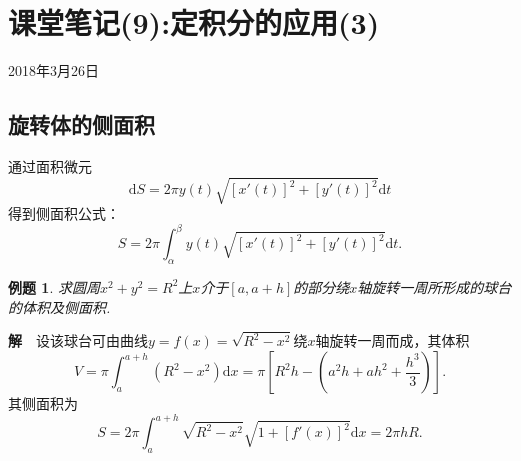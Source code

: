 \documentclass[UTF8]{article}
\newcommand{\dx}{\mathrm{d}x}
\newcommand{\jie}{\textbf{解}$\quad$}
\newtheorem{exa}{\hspace{2em}例题}[section]
\begin{document}
\section{课堂笔记(9):定积分的应用(3)}
\begin{center}
  2018年3月26日
\end{center}
\subsection{旋转体的侧面积}
通过面积微元
$$\mathrm{d}S=2\pi y(t)\sqrt{[x'(t)]^2+[y'(t)]^2}\mathrm{d}t$$得到侧面积公式：
$$S=2\pi\int_\alpha^\beta y(t)\sqrt{[x'(t)]^2+[y'(t)]^2}\mathrm{d}t.$$
\begin{exa}
  求圆周$x^2+y^2=R^2$上$x$介于$[a,a+h]$的部分绕$x$轴旋转一周所形成的球台的体积及侧面积.
\end{exa}
\jie 设该球台可由曲线$y=f(x)=\sqrt{R^2-x^2}$绕$x$轴旋转一周而成，其体积
$$V=\pi\int_a^{a+h}(R^2-x^2)\dx=\pi\left[R^2h-\left(a^2h+ah^2+\frac{h^3}{3}\right)\right].$$
其侧面积为
$$S=2\pi\int_a^{a+h}\sqrt{R^2-x^2}\sqrt{1+[f'(x)]^2}\dx=2\pi hR.$$
\end{document}
